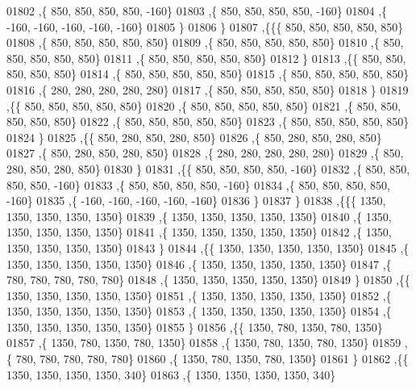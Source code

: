 \begin{DoxyCode}
01802    ,\{   850,   850,   850,   850,  -160\}
01803    ,\{   850,   850,   850,   850,  -160\}
01804    ,\{  -160,  -160,  -160,  -160,  -160\}
01805    \}
01806   \}
01807  ,\{\{\{   850,   850,   850,   850,   850\}
01808    ,\{   850,   850,   850,   850,   850\}
01809    ,\{   850,   850,   850,   850,   850\}
01810    ,\{   850,   850,   850,   850,   850\}
01811    ,\{   850,   850,   850,   850,   850\}
01812    \}
01813   ,\{\{   850,   850,   850,   850,   850\}
01814    ,\{   850,   850,   850,   850,   850\}
01815    ,\{   850,   850,   850,   850,   850\}
01816    ,\{   280,   280,   280,   280,   280\}
01817    ,\{   850,   850,   850,   850,   850\}
01818    \}
01819   ,\{\{   850,   850,   850,   850,   850\}
01820    ,\{   850,   850,   850,   850,   850\}
01821    ,\{   850,   850,   850,   850,   850\}
01822    ,\{   850,   850,   850,   850,   850\}
01823    ,\{   850,   850,   850,   850,   850\}
01824    \}
01825   ,\{\{   850,   280,   850,   280,   850\}
01826    ,\{   850,   280,   850,   280,   850\}
01827    ,\{   850,   280,   850,   280,   850\}
01828    ,\{   280,   280,   280,   280,   280\}
01829    ,\{   850,   280,   850,   280,   850\}
01830    \}
01831   ,\{\{   850,   850,   850,   850,  -160\}
01832    ,\{   850,   850,   850,   850,  -160\}
01833    ,\{   850,   850,   850,   850,  -160\}
01834    ,\{   850,   850,   850,   850,  -160\}
01835    ,\{  -160,  -160,  -160,  -160,  -160\}
01836    \}
01837   \}
01838  ,\{\{\{  1350,  1350,  1350,  1350,  1350\}
01839    ,\{  1350,  1350,  1350,  1350,  1350\}
01840    ,\{  1350,  1350,  1350,  1350,  1350\}
01841    ,\{  1350,  1350,  1350,  1350,  1350\}
01842    ,\{  1350,  1350,  1350,  1350,  1350\}
01843    \}
01844   ,\{\{  1350,  1350,  1350,  1350,  1350\}
01845    ,\{  1350,  1350,  1350,  1350,  1350\}
01846    ,\{  1350,  1350,  1350,  1350,  1350\}
01847    ,\{   780,   780,   780,   780,   780\}
01848    ,\{  1350,  1350,  1350,  1350,  1350\}
01849    \}
01850   ,\{\{  1350,  1350,  1350,  1350,  1350\}
01851    ,\{  1350,  1350,  1350,  1350,  1350\}
01852    ,\{  1350,  1350,  1350,  1350,  1350\}
01853    ,\{  1350,  1350,  1350,  1350,  1350\}
01854    ,\{  1350,  1350,  1350,  1350,  1350\}
01855    \}
01856   ,\{\{  1350,   780,  1350,   780,  1350\}
01857    ,\{  1350,   780,  1350,   780,  1350\}
01858    ,\{  1350,   780,  1350,   780,  1350\}
01859    ,\{   780,   780,   780,   780,   780\}
01860    ,\{  1350,   780,  1350,   780,  1350\}
01861    \}
01862   ,\{\{  1350,  1350,  1350,  1350,   340\}
01863    ,\{  1350,  1350,  1350,  1350,   340\}

\end{DoxyCode}
